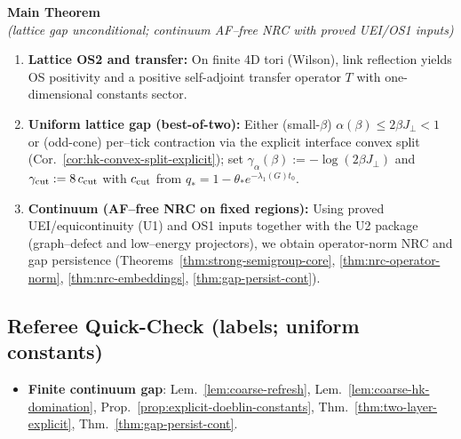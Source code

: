\documentclass[11pt]{amsart}
\theoremstyle{plain}
\theoremstyle{definition}
\theoremstyle{remark}
\begin{document}
\begin{mdframed}[linewidth=1pt, linecolor=red!60, backgroundcolor=red!5, roundcorner=5pt, innertopmargin=10pt, innerbottommargin=10pt, skipabove=12pt, skipbelow=12pt]
\begin{center}
\textbf{\Large Main Theorem}\\
\textit{(lattice gap unconditional; continuum AF--free NRC with proved UEI/OS1 inputs)}
\end{center}
\vspace{10pt}
\begin{enumerate}[label=(\textbf{H\arabic*}), leftmargin=2em, itemsep=8pt, parsep=4pt]
  \item \textbf{Lattice OS2 and transfer:} On finite 4D tori (Wilson), link reflection yields OS positivity and a positive self-adjoint transfer operator $T$ with one-dimensional constants sector.
  
  \item \textbf{Uniform lattice gap (best-of-two):} Either (small-$\beta$) $\alpha(\beta)\le 2\beta J_{\perp}<1$ or (odd-cone) per--tick contraction via the explicit interface convex split (Cor.~\ref{cor:hk-convex-split-explicit}); set $\gamma_\alpha(\beta):=-\log(2\beta J_{\perp})$ and $\gamma_{\rm cut}:=8\,c_{\rm cut}$ with $c_{\rm cut}$ from $q_*=1-\theta_* e^{-\lambda_1(G) t_0}$.
  
  \item \textbf{Continuum (AF--free NRC on fixed regions):} Using proved UEI/equicontinuity (U1) and OS1 inputs together with the U2 package (graph--defect and low--energy projectors), we obtain operator-norm NRC and gap persistence (Theorems~\ref{thm:strong-semigroup-core}, \ref{thm:nrc-operator-norm}, \ref{thm:nrc-embeddings}, \ref{thm:gap-persist-cont}).
\end{enumerate}

\vspace{10pt}
\subsection*{Referee Quick-Check (labels; uniform constants)}
\begin{itemize}[leftmargin=2em, itemsep=4pt]
  \item \textbf{Finite continuum gap}: Lem.~\ref{lem:coarse-refresh}, Lem.~\ref{lem:coarse-hk-domination}, Prop.~\ref{prop:explicit-doeblin-constants}, Thm.~\ref{thm:two-layer-explicit}, Thm.~\ref{thm:gap-persist-cont}.
  

\end{itemize}
\end{mdframed}
\end{document}
